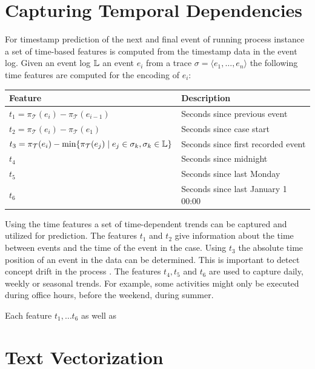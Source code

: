 \section{Capturing Temporal Dependencies}\label{sec:time}


For timestamp prediction of the next and final event of running process instance a set of time-based features is computed from the timestamp data in the event log.
Given an event log $\mathbb{L}$ an event $e_i$ from a trace $\sigma = \langle e_1, \dots, e_n \rangle$ the following time features are computed for the encoding of $e_i$: 

\begin{center}
\begin{tabularx}{\textwidth}{l l}
	\toprule
	 \textbf{Feature} & \textbf{Description} \\
	 \midrule
	$t_1 = \pi_\mathcal{T}(e_i) - \pi_\mathcal{T}(e_{i-1})$ & Seconds since previous event \\
	$t_2 = \pi_\mathcal{T}(e_i) - \pi_\mathcal{T}(e_1)$ & Seconds since case start \\
	$t_3 = \pi_\mathcal{T}(e_i) - \min\{\pi_\mathcal{T}(e_{j}) \mid  e_j \in \sigma_k, \sigma_k \in \mathbb{L}\}$ & Seconds since first recorded event \\
	$t_4$ & Seconds since midnight \\
	$t_5$ & Seconds since last Monday \\
	$t_6$ & Seconds since last January 1 00:00 \\
	\bottomrule
\end{tabularx}
\end{center}

Using the time features a set of time-dependent trends can be captured and utilized for prediction.
The features $t_1$ and $t_2$ give information about the time between events and the time of the event in the case.
Using $t_3$ the absolute time position of an event in the data can be determined.
This is important to detect concept drift in the process \cite{DBLP:journals/tnn/BoseAZP14}.
The features $t_4, t_5$ and $t_6$ are used to capture daily, weekly or seasonal trends.
For example, some activities might only be executed during office hours, before the weekend, during summer.

Each feature $t_1, \dots t_6$ as well as 

\section{Text Vectorization}\label{sec:text}


